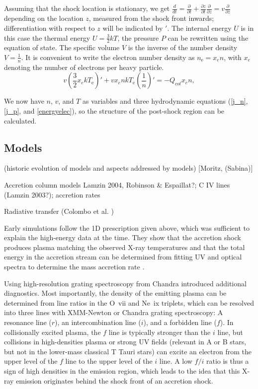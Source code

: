 Assuming that the shock location is stationary, we get $\frac{d}{dt}=\frac{\partial}{\partial t}+\frac{\partial z}{\partial t}\frac{\partial}{\partial z}=v\frac{\partial}{\partial z}$ depending on the location $z$, measured from the shock front inwards; differentiation with respect to $z$ will be indicated by $'$.
The internal energy $U$ is in this case the thermal energy $U=\frac{3}{2}kT$, the pressure $P$ can be rewritten using the equation of state. The specific volume $V$ is the inverse of the number density $V=\frac{1}{n}$. 
It is convenient to write the electron number density as \mbox{$n_{\mathrm{e}}=x_e n$,} with $x_e$ denoting the number of electrons per heavy particle.
\begin{equation}
\label{energyelec}
v\left(\frac{3}{2}x_e k T_{\mathrm{e}}\right)'+v x_e n k T_{\mathrm{e}} \left(\frac{1}{n}\right)'=-Q_{col} x_e n,
\end{equation} 

We now have $n$, $v$, and $T$ as variables and three hydrodynamic equations (\ref{j_n}, \ref{j_p}, and \ref{energyelec}), so the structure of the post-shock region can be calculated.


\subsection{Models}

\label{sect:accretionmodels}
{\color{blue}(historic evolution of models and aspects addressed by models) [Moritz, (Sabina)]

Accretion column models Lamzin 2004, Robinson & Espaillat?; C IV lines (Lamzin 2003?); accretion rates



Radiative transfer (Colombo et al. )


}


Early simulations follow the 1D prescription given above, which was sufficient to explain the high-energy data at the time. They show that the accretion shock produces plasma matching the observed X-ray temperatures \citep{lamzin_1998} and that the total energy in the accretion stream can be determined from fitting UV and optical spectra to determine the mass accretion rate \citep{calvet_1998}.

Using high-resolution grating spectroscopy from Chandra \citet{Kastner_2002} introduced additional diagnostics. Most importantly, the density of the emitting plasma can be determined from line ratios in the O~{\sc vii} and Ne~{\sc ix} triplets, which can be resolved into three lines with XMM-Newton or Chandra grating spectroscopy: A resonance line ($r$), an intercombination line ($i$), and a forbidden line ($f$). In collisionally excited plasma, the $f$ line is typically stronger than the $i$ line, but collisions in high-densities plasma or strong UV fields (relevant in A or B stars, but not in the lower-mass classical T Tauri stars) can excite an electron from the upper level of the $f$ line to the upper level of the $i$ line. A low $f/i$ ratio is thus a sign of high densities in the emission region, which leads to the idea that this X-ray emission originates behind the shock front of an accretion shock.

